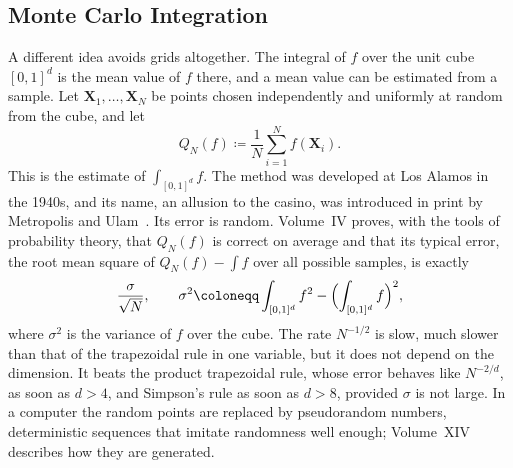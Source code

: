 \begin{table}
\end{table}

\subsection{Monte Carlo Integration}

A different idea avoids grids altogether. The integral of $f$ over the unit cube $[0,1]^d$ is the mean value of $f$ there, and a mean value can be estimated from a sample. Let $\mathbf X_1,\ldots,\mathbf X_N$ be points chosen independently and uniformly at random from the cube, and let
\[
Q_N(f)\coloneqq\frac1N\sum_{i=1}^Nf(\mathbf X_i).
\]
This is the  estimate of $\int_{[0,1]^d}f$. The method was developed at Los Alamos in the 1940s, and its name, an allusion to the casino, was introduced in print by Metropolis and Ulam~\cite{metropolis1949}. Its error is random. Volume~IV proves, with the tools of probability theory, that $Q_N(f)$ is correct on average and that its typical error, the root mean square of $Q_N(f)-\int f$ over all possible samples, is exactly
\begin{equation}
\frac\sigma{\sqrt N},\qquad\sigma^2\coloneqq\int_{[0,1]^d}f^2-\Bigl(\int_{[0,1]^d}f\Bigr)^2 ,
\label{eq:monte-carlo-error}
\end{equation}
where $\sigma^2$ is the variance of $f$ over the cube. The rate $N^{-1/2}$ is slow, much slower than that of the trapezoidal rule in one variable, but it does not depend on the dimension. It beats the product trapezoidal rule, whose error behaves like $N^{-2/d}$, as soon as $d>4$, and Simpson's rule as soon as $d>8$, provided $\sigma$ is not large. In a computer the random points are replaced by pseudorandom numbers, deterministic sequences that imitate randomness well enough; Volume~XIV describes how they are generated.

